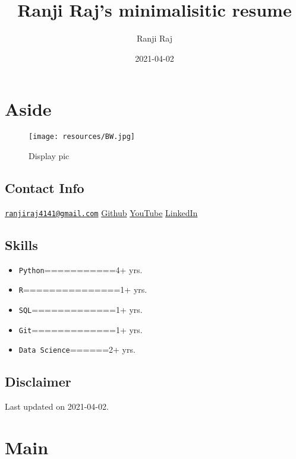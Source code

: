 \documentclass[
]{article}
\title{Ranji Raj's minimalisitic resume}
\author{Ranji Raj}
\date{2021-04-02}
\providecommand{\tightlist}{%
  \setlength{\itemsep}{0pt}\setlength{\parskip}{0pt}}
\begin{document}
\maketitle

\hypertarget{aside}{%
\section{Aside}\label{aside}}

\begin{figure}
\texttt{[image: resources/BW.jpg]} \caption{Display pic}\label{fig:pressure}
\end{figure}

\hypertarget{contact}{%
\subsection{Contact Info}\label{contact}}

\href{mailto:ranjiraj4141@gmail.com}{\nolinkurl{ranjiraj4141@gmail.com}}
\href{https://github.com/ranjiGT}{Github}
\href{https://www.youtube.com/c/RanjiRaj18/}{YouTube}
\href{https://www.linkedin.com/in/reng99/}{LinkedIn}

\hypertarget{skills}{%
\subsection{Skills}\label{skills}}

\begin{itemize}
\tightlist
\item
  \texttt{Python}===========4+ yrs.
\item
  \texttt{R}===============1+ yrs.
\item
  \texttt{SQL}=============1+ yrs.
\item
  \texttt{Git}=============1+ yrs.
\item
  \texttt{Data\ Science}======2+ yrs.
\end{itemize}

\hypertarget{disclaimer}{%
\subsection{Disclaimer}\label{disclaimer}}

Last updated on 2021-04-02.

\hypertarget{main}{%
\section{Main}\label{main}}
\end{document}
